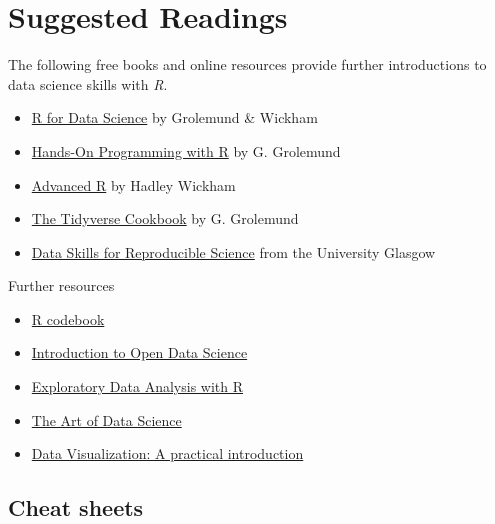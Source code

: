 \documentclass[
]{scrartcl}
\providecommand{\tightlist}{%
  \setlength{\itemsep}{0pt}\setlength{\parskip}{0pt}}
\begin{document}
\section{Suggested Readings}\label{readings}

The following free books and online resources provide further introductions to data science skills with \emph{R}.

\begin{itemize}
\tightlist
\item
  \href{https://r4ds.had.co.nz/}{R for Data Science} by Grolemund \& Wickham
\item
  \href{https://rstudio-education.github.io/hopr/}{Hands-On Programming with R} by G. Grolemund
\item
  \href{https://adv-r.hadley.nz/}{Advanced R} by Hadley Wickham
\item
  \href{https://rstudio-education.github.io/tidyverse-cookbook}{The Tidyverse Cookbook} by G. Grolemund
\item
  \href{https://psyteachr.github.io/reprores-v3/index.html}{Data Skills for Reproducible Science} from the University Glasgow
\end{itemize}

Further resources

\begin{itemize}
\tightlist
\item
  \href{http://www.cookbook-r.com/}{R codebook}
\item
  \href{http://ohi-science.org/data-science-training/}{Introduction to Open Data Science}
\item
  \href{https://bookdown.org/rdpeng/exdata/}{Exploratory Data Analysis with R}
\item
  \href{https://bookdown.org/rdpeng/artofdatascience/}{The Art of Data Science}
\item
  \href{http://socviz.co/}{Data Visualization: A practical introduction}
\end{itemize}

\subsection{Cheat sheets}\label{cheatsheets}
\end{document}
